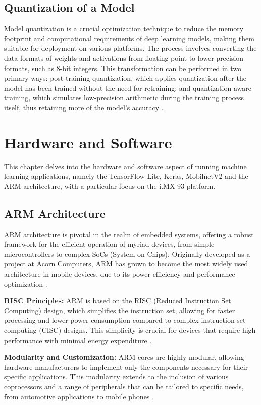 \section{Quantization of a Model}
Model quantization is a crucial optimization technique to reduce the memory footprint and computational requirements of deep learning models, making them suitable for deployment on various platforms. The process involves converting the data formats of weights and activations from floating-point to lower-precision formats, such as 8-bit integers. This transformation can be performed in two primary ways: post-training quantization, which applies quantization after the model has been trained without the need for retraining; and quantization-aware training, which simulates low-precision arithmetic during the training process itself, thus retaining more of the model's accuracy \cite{Jacob2018}.

\chapter{Hardware and Software}
This chapter delves into the hardware and software aspect of running machine learning applications, namely the TensorFlow Lite, Keras, MobilnetV2 and the ARM architecture, with a particular focus on the i.MX 93 platform.

\section{ARM Architecture}
ARM architecture is pivotal in the realm of embedded systems, offering a robust framework for the efficient operation of myriad devices, from simple microcontrollers to complex SoCs (System on Chips). Originally developed as a project at Acorn Computers, ARM has grown to become the most widely used architecture in mobile devices, due to its power efficiency and performance optimization \cite{Dandamudi2005}.

\textbf{RISC Principles:} ARM is based on the RISC (Reduced Instruction Set Computing) design, which simplifies the instruction set, allowing for faster processing and lower power consumption compared to complex instruction set computing (CISC) designs. This simplicity is crucial for devices that require high performance with minimal energy expenditure \cite{Dandamudi2005}.

\textbf{Modularity and Customization:} ARM cores are highly modular, allowing hardware manufacturers to implement only the components necessary for their specific applications. This modularity extends to the inclusion of various coprocessors and a range of peripherals that can be tailored to specific needs, from automotive applications to mobile phones \cite{iMX93FAMFS}.

